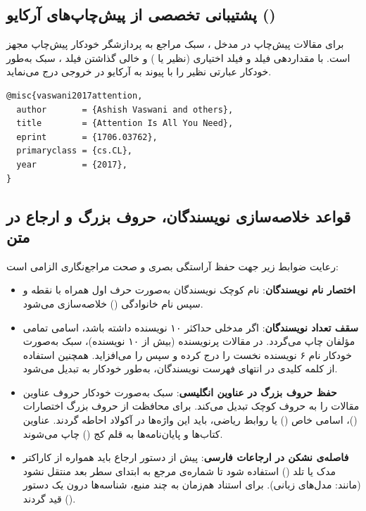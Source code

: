 \subsection{پشتیبانی تخصصی از پیش‌چاپ‌های آرکایو ()}

برای مقالات پیش‌چاپ در مدخل ، سبک مراجع به پردازشگر خودکار پیش‌چاپ مجهز است. با مقداردهی فیلد  و فیلد اختیاری  (نظیر  یا ) و خالی گذاشتن فیلد ، سبک به‌طور خودکار عبارتی نظیر  را با پیوند به آرکایو در خروجی درج می‌نماید.
\begin{latin}
\footnotesize
\begin{verbatim}
@misc{vaswani2017attention,
  author       = {Ashish Vaswani and others},
  title        = {Attention Is All You Need},
  eprint       = {1706.03762},
  primaryclass = {cs.CL},
  year         = {2017},
}
\end{verbatim}
\end{latin}


\subsection{قواعد خلاصه‌سازی نویسندگان، حروف بزرگ و ارجاع در متن}

رعایت ضوابط زیر جهت حفظ آراستگی بصری و صحت مراجع‌نگاری الزامی است:
\begin{itemize}
    \item \textbf{اختصار نام نویسندگان}: نام کوچک نویسندگان به‌صورت حرف اول همراه با نقطه و سپس نام خانوادگی () خلاصه‌سازی می‌شود.
    \item \textbf{سقف تعداد نویسندگان}: اگر مدخلی حداکثر ۱۰ نویسنده داشته باشد، اسامی تمامی مؤلفان چاپ می‌گردد. در مقالات پرنویسنده (بیش از ۱۰ نویسنده)، سبک به‌صورت خودکار نام ۶ نویسنده نخست را درج کرده و سپس  را می‌افزاید. همچنین استفاده از کلمه کلیدی  در انتهای فهرست نویسندگان، به‌طور خودکار به  تبدیل می‌شود.
    \item \textbf{حفظ حروف بزرگ در عناوین انگلیسی}: سبک به‌صورت خودکار حروف عناوین مقالات را به حروف کوچک تبدیل می‌کند. برای محافظت از حروف بزرگ اختصارات ()، اسامی خاص () یا روابط ریاضی، باید این واژه‌ها در آکولاد \code{\{\ldots\}} احاطه گردند. عناوین کتاب‌ها و پایان‌نامه‌ها به قلم کج () چاپ می‌شوند.
    \item \textbf{فاصله‌ی نشکن در ارجاعات فارسی}: پیش از دستور ارجاع باید همواره از کاراکتر مدک یا تلد (\lr{\textasciitilde}) استفاده شود تا شماره‌ی مرجع به ابتدای سطر بعد منتقل نشود (مانند: مدل‌های زبانی). برای استناد هم‌زمان به چند منبع، شناسه‌ها درون یک دستور () قید گردند.
\end{itemize}


